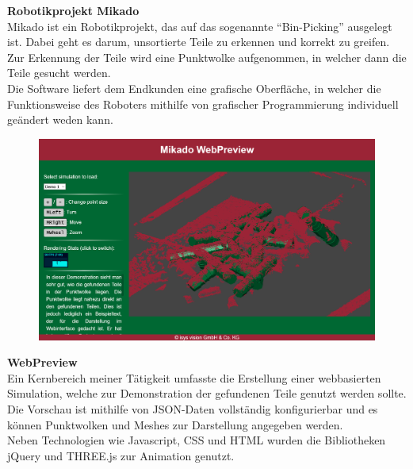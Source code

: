 \documentclass[a1,landscape]{a0poster}
\newenvironment{block}{\begin{mdframed}[roundcorner=25pt,innerleftmargin=40pt,innertopmargin=40pt,innerrightmargin=40pt,innerbottommargin=40pt,backgroundcolor=color_SoftBlue,linecolor=color_SoftBlue]}{\end{mdframed}}
\begin{document}
\begin{textblock*}{2100pt}
\begin{multicols}{2}
\begin{block}
\begin{figure}
			\end{figure}
			\textbf{Robotikprojekt Mikado}\\
			Mikado ist ein Robotikprojekt, das auf das sogenannte ``Bin-Picking'' ausgelegt ist. Dabei geht es darum, unsortierte Teile zu erkennen und korrekt zu greifen.
			Zur Erkennung der Teile wird eine Punktwolke aufgenommen, in welcher dann die Teile gesucht werden.\\
			Die Software liefert dem Endkunden eine grafische Oberfläche, in welcher die Funktionsweise des Roboters mithilfe von grafischer Programmierung individuell geändert weden kann.
		\end{block}
		\vfill
		\begin{block}
			\begin{figure}
				\includegraphics[width=\linewidth]{media/webpreview.png}
			\end{figure}
			\textbf{WebPreview}\\
			Ein Kernbereich meiner Tätigkeit umfasste die Erstellung einer webbasierten Simulation, welche zur Demonstration der gefundenen Teile genutzt werden sollte. Die Vorschau ist mithilfe von JSON-Daten vollständig konfigurierbar und es können Punktwolken und Meshes zur Darstellung angegeben werden.\\
			Neben Technologien wie Javascript, CSS und HTML wurden die Bibliotheken jQuery und THREE.js zur Animation genutzt.
		\end{block}
		\vfill
		\begin{block}
			\begin{figure}

\end{figure}
\end{block}
\end{multicols}
\end{textblock*}
\end{document}
